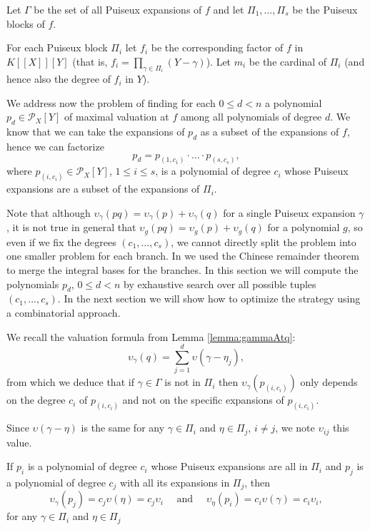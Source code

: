\documentclass[a4paper,11pt]{amsart}%
\theoremstyle{definition}
\theoremstyle{plain}
\theoremstyle{remark}
\begin{document}
Let $\Gamma$ be the set of all Puiseux expansions of $f$ and let $\Pi_1, \dots, \Pi_s$ be the Puiseux blocks of $f$.

For each Puiseux block $\Pi_{i}$ let $f_i$ be the corresponding
factor of $f$ in $K[[X]][Y]$ (that is, $f_i = \prod_{\gamma \in \Pi_i} (Y - \gamma)$). Let $m_i$ be the cardinal of $\Pi_i$ (and hence also the degree of $f_i$ in $Y$).

We address now the problem of finding for each $0 \le d < n$ a polynomial $p_d \in {\mathcal{P}_{X}}[Y]$ of maximal valuation at $f$ among all polynomials of degree $d$.
We know that we can take the expansions of $p_d$ as a subset of the expansions of $f$, hence we can factorize
$$
p_d = p_{(1, c_1)} \cdot \dots \cdot p_{(s, c_s)},
$$
where $p_{(i, c_i)} \in \mathcal{P}_{X}[Y]$, $1 \le i \le s$, is a polynomial of degree $c_i$ whose Puiseux expansions are a subset of the expansions of $\Pi_i$.

Note that although $\upsilon_{\gamma}(pq) = \upsilon_{\gamma}(p) + \upsilon_{\gamma}(q)$ for a single Puiseux expansion $\gamma$, it is not true in general that $\upsilon_{g}(pq) = \upsilon_{g}(p) + \upsilon_{g}(q)$ for a polynomial $g$, so even if we fix the degrees $(c_1, \dots, c_s)$, we cannot directly split the problem into one smaller problem for each branch. In \cite{intbas} we used the Chinese remainder theorem to merge the integral bases for the branches. In this section we will compute the polynomials $p_d$, $0 \le d < n$ by exhaustive search over all possible tuples $(c_1, \dots, c_s)$. In the next section we will show how to optimize the strategy using a combinatorial approach.

We recall the valuation formula from Lemma \ref{lemma:gammaAtq}:
$$
\upsilon_{\gamma}(q)= \sum_{j=1}^{d}\upsilon(\gamma-\eta_{j}),
$$
from which we deduce that if $\gamma \in \Gamma$ is not in $\Pi_{i}$ then $\upsilon_{\gamma} (p_{(i,c_i)})$ only depends on the degree $c_i$ of $p_{(i, c_i)}$ and not on the specific expansions of $p_{(i, c_i)}$.

Since $\upsilon(\gamma - \eta)$ is the same for any $\gamma \in\Pi_{i}$ and $\eta \in \Pi_j$, $i \ne j$, we note $\upsilon_{ij}$ this value.

If $p_i$ is a polynomial of degree $c_i$ whose Puiseux expansions are all in $\Pi_i$ and $p_j$ is a polynomial of degree $c_j$ with all its expansions in $\Pi_j$, then
$$
\upsilon_{\gamma}(p_j) = c_j \upsilon(\eta) = c_j \upsilon_i \quad \text{ and } \quad \upsilon_{\eta}(p_i) = c_i \upsilon(\gamma) = c_i \upsilon_i,
$$
for any $\gamma \in\Pi_{i}$ and $\eta \in \Pi_{j}$
\end{document}
